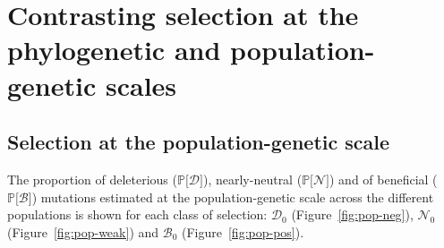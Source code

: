 \documentclass{article}
\newcommand{\proba}{\mathbb{P}}
\newcommand{\SphyDel}{\mathcal{D}_0}
\newcommand{\SphyNeu}{\mathcal{N}_0}
\newcommand{\SphyBen}{\mathcal{B}_0}
\newcommand{\SpopDel}{\mathcal{D}}
\newcommand{\SpopNeu}{\mathcal{N}}
\newcommand{\SpopBen}{\mathcal{B}}
\newcommand{\ProbaPopDel}{\proba{[} \SpopDel]}
\newcommand{\ProbaPopNeu}{\proba{[} \SpopNeu ]}
\newcommand{\ProbaPopBen}{\proba{[} \SpopBen ]}
\begin{document}
    \newpage

    \section{Contrasting selection at the phylogenetic and population-genetic scales}

    \subsection{Selection at the population-genetic scale}
    The proportion of deleterious ($\ProbaPopDel$), nearly-neutral ($\ProbaPopNeu$) and of beneficial ($\ProbaPopBen$) mutations estimated at the population-genetic scale across the different populations is shown for each class of selection:
    $\SphyDel$ (Figure~\ref{fig:pop-neg}), $\SphyNeu$ (Figure~\ref{fig:pop-weak}) and $\SphyBen$ (Figure~\ref{fig:pop-pos}).
\end{document}
